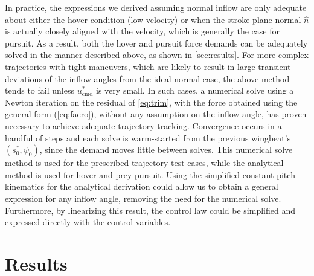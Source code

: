\documentclass[11pt,letterpaper]{article}
\begin{document}
In practice, the expressions we derived assuming
normal inflow are only adequate about either the hover
condition (low velocity) or when the stroke-plane
normal $\hat{n}$ is actually closely aligned with the
velocity, which is generally the case for pursuit.
As a result, both the hover and pursuit force demands
can be adequately solved in the manner described above,
as shown in \autoref{sec:results}.
For more complex trajectories with tight maneuvers, which are
likely to result in large transient deviations of the inflow angles
from the ideal normal case, the above method tends to fail
unless $u^*_\text{cmd}$ is very small.
In such cases, a numerical solve using a Newton iteration on
the residual of \autoref{eq:trim}, with the force
obtained using the general form (\autoref{eq:faero}),
without any assumption on the inflow angle,
has proven necessary
to achieve adequate trajectory tracking.
Convergence occurs in a handful of steps and each solve is warm-started
from the previous wingbeat's $(s_0^*, \psi_0)$, since the demand
moves little between solves. This numerical solve method
is used for the prescribed trajectory test cases,
while the analytical method is used for hover and prey pursuit.
Using the simplified constant-pitch kinematics
for the analytical derivation could allow us to obtain a general
expression for any inflow angle, removing the need for the numerical solve.
Furthermore, by linearizing this result, the control law could
be simplified and expressed directly with the control variables.


\section{Results}\label{sec:results}
\end{document}
